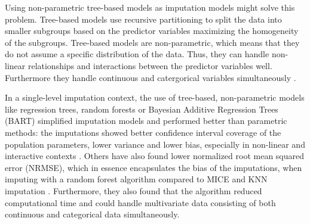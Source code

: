 \documentclass[10pt, a4paper, titlepage]{article}
\begin{document}

Using non-parametric tree-based models as imputation models might solve this problem. Tree-based models use recursive partitioning to split the data into smaller subgroups based on the predictor variables maximizing the homogeneity of the subgroups. Tree-based models are non-parametric, which means that they do not assume a specific distribution of the data. Thus, they can handle non-linear relationships and interactions between the predictor variables well. Furthermore they handle continuous and catergorical variables simultaneously \citep{hill2020, burgette2010, lin2019, chipman2010, james2021, salditt2023, breiman1984}.

In a single-level imputation context, the use of tree-based, non-parametric models like regression trees, random forests or Bayesian Additive Regression Trees (BART) simplified imputation models and performed better than parametric methods: the imputations showed better confidence interval coverage of the population parameters, lower variance and lower bias, especially in non-linear and interactive contexts \citep{burgette2010, xu2016, silva2022}. Others have also found lower normalized root mean squared error (NRMSE), which in essence encapsulates the bias of the imputations, when imputing with a random forest algorithm compared to MICE and KNN imputation \citep{stekhoven2012, waljee2013}. Furthermore, they also found that the algorithm reduced computational time and could handle multivariate data consisting of both continuous and categorical data simultaneously.
\end{document}
